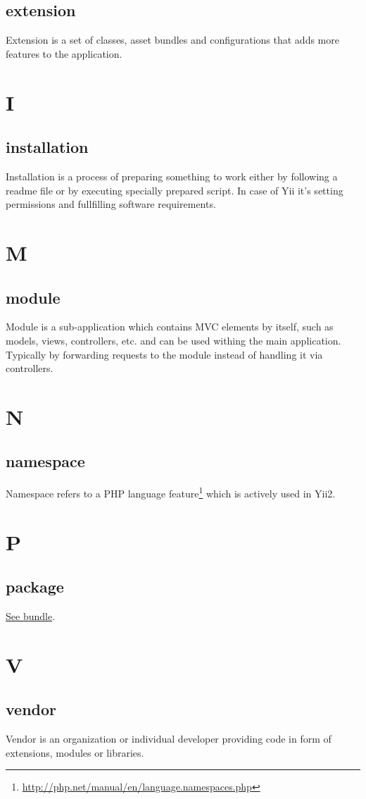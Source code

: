 \subsection{extension}
Extension is a set of classes, asset bundles and configurations that adds more features to the application.

\section{I}
\subsection{installation}
Installation is a process of preparing something to work either by following a readme file or by executing specially prepared script. In case of Yii it's setting permissions and fullfilling software requirements.

\section{M}
\subsection{module}
Module is a sub-application which contains MVC elements by itself, such as models, views, controllers, etc. and can be used withing the main application. Typically by forwarding requests to the module instead of handling it via controllers.

\section{N}
\subsection{namespace}
Namespace refers to a PHP language feature\footnote{\url{http://php.net/manual/en/language.namespaces.php}} which is actively used in Yii2.

\section{P}
\subsection{package}
\hyperref[glossary.md::::bundle]{See bundle}.

\section{V}
\subsection{vendor}
Vendor is an organization or individual developer providing code in form of extensions, modules or libraries.



